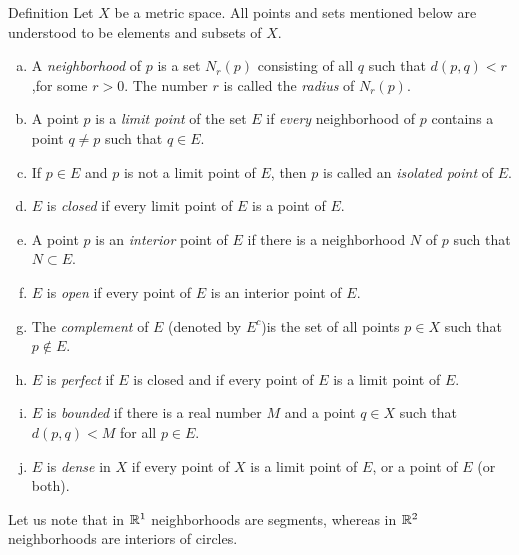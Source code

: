\begin{mydef}\label{mydef:2.18}
    Definition Let $X$ be a metric space. All points and sets mentioned below are understood to be elements and subsets of $X$.
    \begin{enumerate}[(a)]
        \item A \emph{neighborhood} of $p$ is a set $N_r(p)$ consisting of all $q$ such that $d(p, q) < r$,for some $r > 0$. The number $r$ is called the \emph{radius} of $N_r(p)$.
        \item A point $p$ is a \emph{limit point} of the set $E$ if \emph{every} neighborhood of $p$ contains a point $q \neq p$ such that $q \in E$.
        \item If $p \in E$ and $p$ is not a limit point of $E$, then $p$ is called an \emph{isolated point} of $E$.
        \item $E$ is \emph{closed} if every limit point of $E$ is a point of $E$.
        \item A point $p$ is an \emph{interior} point of $E$ if there is a neighborhood $N$ of $p$ such that $N \subset E$.
        \item $E$ is \emph{open} if every point of $E$ is an interior point of $E$.
        \item The \emph{complement} of $E$ (denoted by $E^c$)is the set of all points $p \in X$ such that $p \not\in E$.
        \item $E$ is \emph{perfect} if $E$ is closed and if every point of $E$ is a limit point of $E$.
        \item $E$ is \emph{bounded} if there is a real number $M$ and a point $q \in X$ such that $d(p,q)< M$ for all $p \in E$.
        \item $E$ is \emph{dense} in $X$ if every point of $X$ is a limit point of $E$, or a point of $E$ (or both).
    \end{enumerate}
\end{mydef}

Let us note that in ${\protect\mathbb R}^1$ neighborhoods are segments, whereas in ${\protect\mathbb R}^2$ neighborhoods are interiors of circles.


